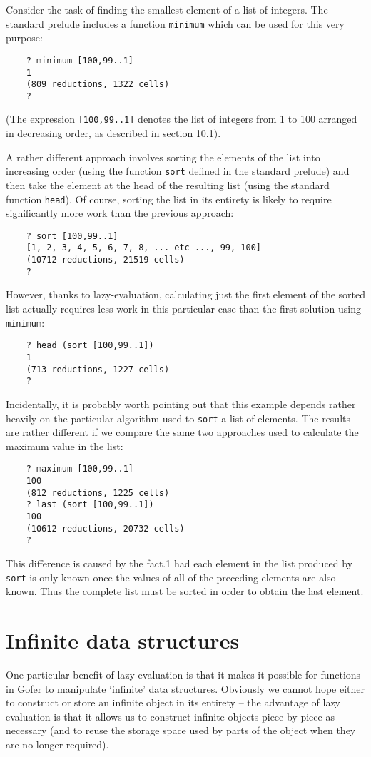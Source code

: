 Consider the task  of  finding  the  smallest  element  of  a  list  of
integers.  The standard prelude includes a function \verb"minimum" which can
be used for this very purpose:
\begin{verbatim}
    ? minimum [100,99..1]
    1
    (809 reductions, 1322 cells)
    ?
\end{verbatim}
(The expression \verb"[100,99..1]" denotes the list of integers from 1 to  100
arranged in decreasing order, as described in section 10.1).

A rather different approach involves sorting the elements of  the  list
into increasing  order  (using  the  function  \verb"sort"  defined  in  the
standard prelude) and  then  take  the  element  at  the  head  of  the
resulting list  (using  the  standard  function  \verb"head").   Of  course,
sorting the list in its entirety is  likely  to  require  significantly
more work than the previous approach:
\begin{verbatim}
    ? sort [100,99..1]
    [1, 2, 3, 4, 5, 6, 7, 8, ... etc ..., 99, 100]
    (10712 reductions, 21519 cells)
    ?
\end{verbatim}
However, thanks to lazy-evaluation, calculating just the first  element
of the sorted list actually requires less work in this particular  case
than the first solution using \verb"minimum":
\begin{verbatim}
    ? head (sort [100,99..1])
    1
    (713 reductions, 1227 cells)
    ?
\end{verbatim}
Incidentally, it is  probably worth  pointing  out  that  this  example
depends rather heavily on the particular algorithm  used  to  \verb"sort"  a
list of elements.  The results are rather different if we  compare  the
same two approaches used to calculate the maximum value in the list:
\begin{verbatim}
    ? maximum [100,99..1]
    100
    (812 reductions, 1225 cells)
    ? last (sort [100,99..1])
    100
    (10612 reductions, 20732 cells)
    ?
\end{verbatim}
This difference is caused by the fact.1 had each  element  in  the  list
produced by \verb"sort" is  only  known  once  the  values  of  all  of  the
preceding elements are also known.  Thus  the  complete  list  must  be
sorted in order to obtain the last element.


\section{Infinite data structures}
One particular benefit of lazy evaluation is that it makes it  possible
for functions  in  Gofer  to  manipulate  `infinite'  data  structures.
Obviously we cannot hope either to   construct  or  store  an  infinite
object in its entirety -- the advantage of lazy evaluation is  that  it
allows us to construct infinite objects piece  by  piece  as  necessary
(and to reuse the storage space used by parts of the object  when  they
are no longer required).

